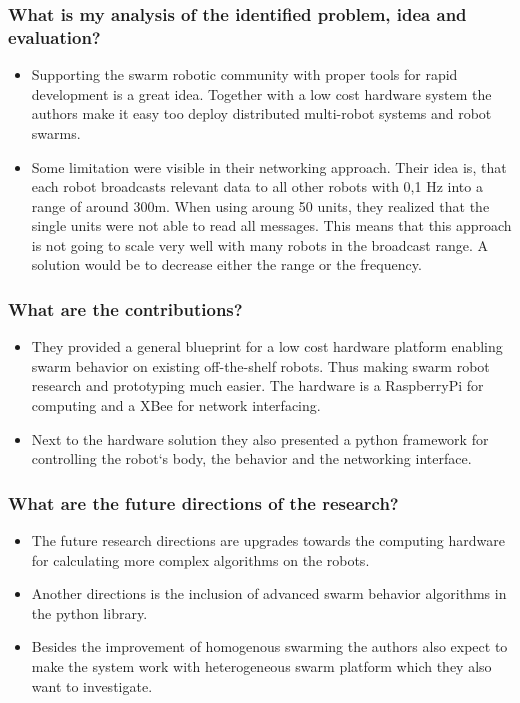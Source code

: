    \subsubsection*{What is my analysis of the identified problem, idea and evaluation?}
    \begin{itemize}
        \item Supporting the swarm robotic community with proper tools for rapid development is a great idea. Together with a low cost hardware system the authors make it easy too deploy distributed multi-robot systems and robot swarms.
        \item Some limitation were visible in their networking approach. Their idea is, that each robot broadcasts relevant data to all other robots with 0,1 Hz into a range of around 300m. When using aroung 50 units, they realized that the single units were not able to read all messages. This means that this approach is not going to scale very well with many robots in the broadcast range. A solution would be to decrease either the range or the frequency.
    \end{itemize}
    \subsubsection*{What are the contributions?}
    \begin{itemize}
        \item They provided a general blueprint for a low cost hardware platform enabling swarm behavior on existing off-the-shelf robots. Thus making swarm robot research and prototyping much easier. The hardware is a RaspberryPi for computing and a XBee for network interfacing.
        \item Next to the hardware solution they also presented a python framework for controlling the robot`s body, the behavior and the networking interface.
    \end{itemize}
    \subsubsection*{What are the future directions of the research?}
    \begin{itemize}
        \item The future research directions are upgrades towards the computing hardware for calculating more complex algorithms on the robots. 
        \item Another directions is the inclusion of advanced swarm behavior algorithms in the python library.
        \item Besides the improvement of homogenous swarming the authors also expect to make the system work with heterogeneous swarm platform which they also want to investigate.
    \end{itemize}
